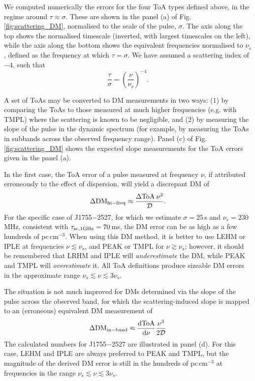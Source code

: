 \documentclass[preprint2,linenumbers]{aastex631}
\newcommand{\src}{J1755$-$2527}
\newcommand{\deriv}[2]{\frac{{\rm d}{#1}}{{\rm d}{#2}}}
\newcommand{\ToA}[1]{{\rm ToA}_{\rm {#1}}}
\begin{document}
We computed numerically \citep[using SciPy's \texttt{root} function;][]{2020NatMe..17..261V} the errors for the four ToA types defined above, in the regime around $\tau \approx \sigma$.
These are shown in the panel (a) of Fig. \ref{fig:scattering_DM}, normalised to the scale of the pulse, $\sigma$.
The axis along the top shows the normalised timescale (inverted, with largest timescales on the left), while the axis along the bottom shows the equivalent frequencies normalised to $\nu_s$, defined as the frequency at which $\tau = \sigma$.
We have assumed a scattering index of $-4$, such that
\begin{equation}
    \frac{\tau}{\sigma} = \left(\frac{\nu}{\nu_s}\right)^{-4}.
\end{equation}

A set of ToAs may be converted to DM measurements in two ways: (1) by comparing the ToAs to those measured at much higher frequencies (e.g. with TMPL) where the scattering is known to be negligible, and (2) by measuring the slope of the pulse in the dynamic spectrum (for example, by measuring the ToAs in subbands across the observed frequency range).
Panel (c) of Fig. \ref{fig:scattering_DM} shows the expected slope measurements for the ToA errors given in the panel (a).

In the first case, the ToA error of a pulse measured at frequency $\nu$, if attributed erroneously to the effect of dispersion, will yield a discrepant DM of
\begin{equation}
    \Delta{\rm DM}_{\rm hi-freq} \approx \frac{\Delta\ToA{}\,\nu^2}{\mathcal{D}}.
\end{equation}
For the specific case of \src{}, for which we estimate $\sigma = 25\,$s and $\nu_s = 230\,$MHz, consistent with $\tau_{\rm sc,1 GHz} = 70\,$ms, the DM error can be as high as a few hundreds of pc\,cm$^{-3}$.
When using this DM method, it is better to use LEHM or IPLE at frequencies $\nu \lesssim \nu_s$, and PEAK or TMPL for $\nu \gtrsim \nu_s$; however, it should be remembered that LRHM and IPLE will \emph{underestimate} the DM, while PEAK and TMPL will \emph{overestimate} it.
All ToA definitions produce sizeable DM errors in the approximate range $\nu_s \lesssim \nu \lesssim 3\nu_s$.

The situation is not much improved for DMs determined via the slope of the pulse across the observed band, for which the scattering-induced slope is mapped to an (erroneous) equivalent DM measurement of
\begin{equation}
    \Delta{\rm DM}_{\rm in-band} \approx \deriv{{\rm ToA}}{\nu} \frac{\nu^3}{2\mathcal{D}}
\end{equation}
The calculated numbers for \src{} are illustrated in panel (d).
For this case, LEHM and IPLE are always preferred to PEAK and TMPL, but the magnitude of the derived DM error is still in the hundreds of pc\,cm$^{-3}$ at frequencies in the range $\nu_s \lesssim \nu \lesssim 3\nu_s$.
\end{document}
